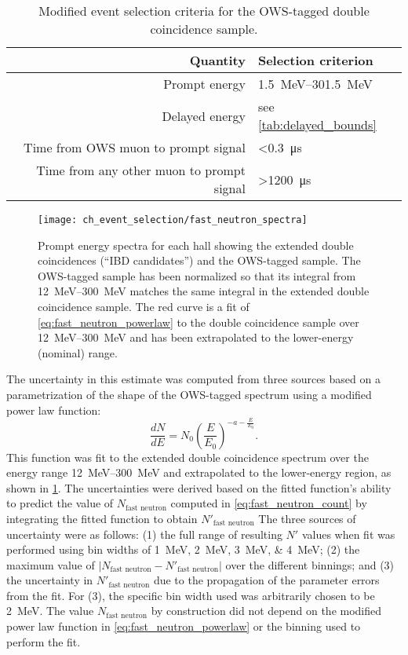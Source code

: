 \begin{table}
    \centering
    \caption[OWS tag criteria]{
        Modified event selection criteria for the OWS-tagged
        double coincidence sample.
    }
    \label{tab:fast_neutron}
    \begin{tabular}[t]{rl}
        \toprule
        Quantity & Selection criterion \\
        \midrule
        Prompt energy & \SIrange{1.5}{301.5}{\MeV} \\
        Delayed energy & see \cref{tab:delayed_bounds} \\
        Time from OWS muon to prompt signal & \SI{<0.3}{\us} \\
        Time from any other muon to prompt signal & \SI{>1200}{\us} \\
        \bottomrule
    \end{tabular}
\end{table}

\begin{figure}
    \centering
    \texttt{[image: ch\_event\_selection/fast\_neutron\_spectra]}
    \caption[Fast neutron spectrum]{
        Prompt energy spectra for each hall
        showing the extended double coincidences (``IBD candidates'')
        and the OWS-tagged sample.
        The OWS-tagged sample has been normalized
        so that its integral from \SIrange{12}{300}{\MeV}
        matches the same integral in the extended double coincidence sample.
        The red curve is a fit of \cref{eq:fast_neutron_powerlaw}
        to the double coincidence sample over \SIrange{12}{300}{\MeV}
        and has been extrapolated to the lower-energy (nominal) range.
    }
    \label{fig:fast_neutron}
\end{figure}

The uncertainty in this estimate was computed from three sources
based on a parametri\-zation of the shape of the OWS-tagged spectrum
using a modified power law function:
\begin{equation}\label{eq:fast_neutron_powerlaw}
    \frac{dN}{dE} = N_0 \left(\frac{E}{E_0}\right)^{-a-\frac{E}{E_0}}.
\end{equation}
This function was fit to the extended double coincidence spectrum
over the energy range \SIrange{12}{300}{\MeV}
and extrapolated to the lower-energy region,
as shown in \cref{fig:fast_neutron}.
The uncertainties were derived based on the fitted function's
ability to predict the value of $N_{\text{fast neutron}}$
computed in \cref{eq:fast_neutron_count}
by integrating the fitted function to obtain $N'_\text{fast neutron}$
The three sources of uncertainty were as follows:
(1) the full range of resulting $N'$ values
when fit was performed using bin widths of \SIlist{1;2;3;4}{\MeV};
(2) the maximum value of $\vert N_\text{fast neutron} - N'_\text{fast neutron}\vert$
over the different binnings;
and (3) the uncertainty in $N'_\text{fast neutron}$ due to
the propagation of the parameter errors from the fit.
For (3), the specific bin width used was arbitrarily chosen to be \SI{2}{\MeV}.
The value $N_\text{fast neutron}$ by construction did not depend
on the modified power law function in \cref{eq:fast_neutron_powerlaw}
or the binning used to perform the fit.

